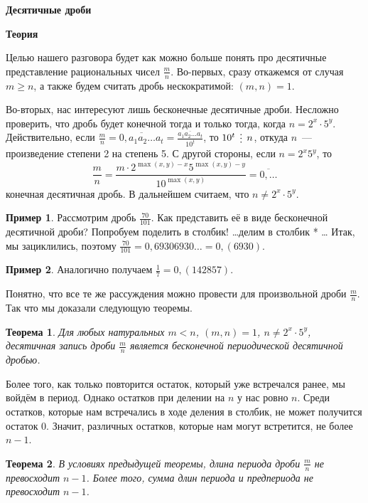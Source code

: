 \documentclass[a4paper,14pt]{extarticle}
\newcommand{\divby}{\mathrel{\smash{\lower.5ex\hbox{$\,\vdots\,$}}}}
\theoremstyle{plain}
\newtheorem{theorem}{Теорема}
\theoremstyle{definition}
\newtheorem{example}{Пример}
\theoremstyle{remark}
\begin{document}
\centerline{{\bf Десятичные дроби}}
\centerline{{\bf Теория}}
\medskip

Целью нашего разговора будет как можно больше понять про десятичные представление рациональных чисел $\frac{m}{n}$.
Во-первых, сразу откажемся от случая $m\geqslant n$, а также будем считать дробь нескократимой: $(m,n)=1$. 

Во-вторых, нас интересуют лишь бесконечные десятичные дроби. Несложно проверить,
что дробь будет конечной тогда и только тогда, когда $n=2^x\cdot 5^y$.
Действительно, если $\frac{m}{n}=\overline{0{,}a_1a_2\ldots a_t}=\frac{\overline{a_1a_2\ldots a_t}}{10^t}$,
то $10^t\divby n$, откуда $n$~--- произведение степени 2 на степень 5. С другой стороны, если $n=2^x5^y$,
то 
\[
\frac{m}{n}=\frac{m\cdot 2^{\max(x,y)-x}5^{\max(x,y)-y}}{10^{\max(x,y)}}=\overline{0{,}\ldots} 
\]
конечная десятичная дробь.
В дальнейшем считаем, что $n\neq 2^x\cdot 5^y$.


\begin{example}
Рассмотрим дробь $\frac{70}{101}$. Как представить её в виде бесконечной десятичной дроби? Попробуем поделить в столбик!
\ldots * делим в столбик * \ldots
Итак, мы зациклились, поэтому $\frac{70}{101}=0{,}69306930\ldots=0{,}(6930)$.
\end{example}

\begin{example}
Аналогично получаем $\frac{1}{7}=0{,}(142857)$.
\end{example}

Понятно, что все те же рассуждения можно провести для произвольной дроби $\frac{m}{n}$.
Так что мы доказали следующую теоремы.

\begin{theorem}
Для любых натуральных $m<n$, $(m,n)=1$, $n\neq 2^x\cdot 5^y$, десятичная запись дроби
$\frac{m}{n}$ является бесконечной периодической десятичной дробью. 
\end{theorem}

Более того, как только повторится остаток, который уже встречался ранее, мы войдём в период.
Однако остатков при делении на $n$ у нас ровно $n$. Среди остатков, которые нам встречались в ходе деления в столбик,
не может получится остаток 0. Значит, различных остатков, которые нам могут встретится, не более $n-1$.

\begin{theorem}
В условиях предыдущей теоремы, длина периода дроби $\frac{m}{n}$ не превосходит $n-1$.
Более того, сумма длин периода и предпериода не превосходит $n-1$.
\end{theorem}
\end{document}
